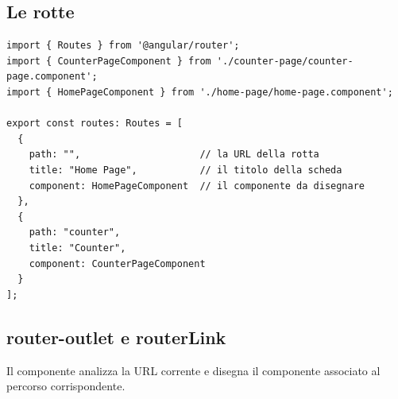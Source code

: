 \subsection{Le rotte}

\begin{affianco}[0.6][c]
\codicepiccolo
\begin{lstlisting}[style=ts, name=src/app/app.routes.ts]
import { Routes } from '@angular/router';
import { CounterPageComponent } from './counter-page/counter-page.component';
import { HomePageComponent } from './home-page/home-page.component';

export const routes: Routes = [
  {
    path: "",                     // la URL della rotta
    title: "Home Page",           // il titolo della scheda
    component: HomePageComponent  // il componente da disegnare
  },
  {
    path: "counter",
    title: "Counter",
    component: CounterPageComponent
  }
];
\end{lstlisting}
\risultato
\begin{immagine}
\end{immagine}
\end{affianco}

\subsection{router-outlet e routerLink}

Il componente  analizza la URL corrente e disegna il
componente associato al percorso corrispondente.

